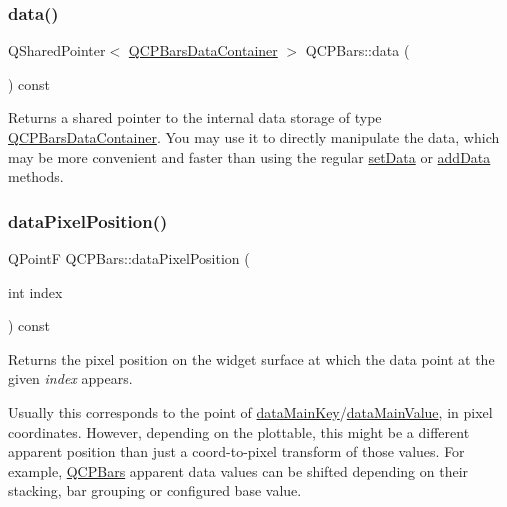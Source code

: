 \mbox{\label{class_q_c_p_bars_a7e373a534d82e18ed27b3fafd1f08fae}} 
\subsubsection{\texorpdfstring{data()}{data()}}
{\footnotesize\ttfamily Q\+Shared\+Pointer$<$ \hyperlink{qcustomplot_8h_a52bf589c9fce1baa36c1d40d69785d46}{Q\+C\+P\+Bars\+Data\+Container} $>$ Q\+C\+P\+Bars\+::data (\begin{DoxyParamCaption}{ }\end{DoxyParamCaption}) const\hspace{0.3cm}{\ttfamily [inline]}}

Returns a shared pointer to the internal data storage of type \hyperlink{qcustomplot_8h_a52bf589c9fce1baa36c1d40d69785d46}{Q\+C\+P\+Bars\+Data\+Container}. You may use it to directly manipulate the data, which may be more convenient and faster than using the regular \hyperlink{class_q_c_p_bars_a6dc562ec7120a8521e1061f2134367e4}{set\+Data} or \hyperlink{class_q_c_p_bars_a323d6970d6d6e3166d89916a7f60f733}{add\+Data} methods. \mbox{\label{class_q_c_p_bars_a55cdaf565cd3384158d1f7f89533bc2d}} 
\subsubsection{\texorpdfstring{data\+Pixel\+Position()}{dataPixelPosition()}}
{\footnotesize\ttfamily Q\+PointF Q\+C\+P\+Bars\+::data\+Pixel\+Position (\begin{DoxyParamCaption}\item[{int}]{index }\end{DoxyParamCaption}) const\hspace{0.3cm}{\ttfamily [virtual]}}





Returns the pixel position on the widget surface at which the data point at the given {\itshape index} appears.

Usually this corresponds to the point of \hyperlink{class_q_c_p_abstract_plottable1_d_aeb156ebf5d3c8de906b428be30733ad8}{data\+Main\+Key}/\hyperlink{class_q_c_p_abstract_plottable1_d_a6be0f657ba85a1688336d76ad649ecf2}{data\+Main\+Value}, in pixel coordinates. However, depending on the plottable, this might be a different apparent position than just a coord-\/to-\/pixel transform of those values. For example, \hyperlink{class_q_c_p_bars}{Q\+C\+P\+Bars} apparent data values can be shifted depending on their stacking, bar grouping or configured base value. 

